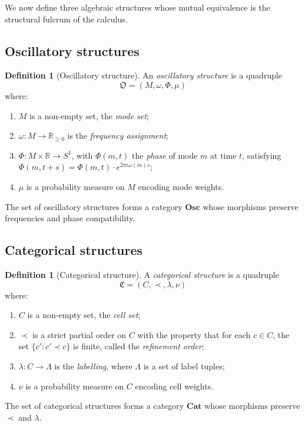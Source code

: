 \documentclass[twocolumn,11pt,a4paper]{article}
\theoremstyle{thmstyle}
\theoremstyle{thmstyle}
\theoremstyle{definition}
\newtheorem{definition}[theorem]{Definition}
\theoremstyle{remark}
\newcommand{\Real}{\mathbb{R}}
\newcommand{\Osc}{\mathfrak{O}}
\newcommand{\Cat}{\mathfrak{C}}
\newcommand{\Cat}{\mathfrak{C}}
\begin{document}
We now define three algebraic structures whose mutual
equivalence is the structural fulcrum of the calculus.

\subsection{Oscillatory structures}

\begin{definition}[Oscillatory structure]\label{def:osc}
An \emph{oscillatory structure} is a quadruple
\[
\Osc = (M, \omega, \Phi, \mu)
\]
where:
\begin{enumerate}[nosep,label=(\roman*)]
\item $M$ is a non-empty set, the \emph{mode set};
\item $\omega : M \to \Real_{\geq 0}$ is the
      \emph{frequency assignment};
\item $\Phi : M \times \Real \to S^{1}$, with
      $\Phi(m, t)$ the \emph{phase} of mode $m$ at time
      $t$, satisfying $\Phi(m, t+s) =
      \Phi(m, t) \cdot e^{2\pi i \omega(m) s}$;
\item $\mu$ is a probability measure on $M$ encoding
      mode weights.
\end{enumerate}
The set of oscillatory structures forms a category
$\mathbf{Osc}$ whose morphisms preserve frequencies
and phase compatibility.
\end{definition}

\subsection{Categorical structures}

\begin{definition}[Categorical structure]\label{def:cat}
A \emph{categorical structure} is a quadruple
\[
\Cat = (C, \prec, \lambda, \nu)
\]
where:
\begin{enumerate}[nosep,label=(\roman*)]
\item $C$ is a non-empty set, the \emph{cell set};
\item $\prec$ is a strict partial order on $C$
      with the property that for each $c \in C$,
      the set $\{c' : c' \prec c\}$ is finite, called
      the \emph{refinement order};
\item $\lambda : C \to \Lambda$ is the
      \emph{labelling}, where $\Lambda$ is a set of
      label tuples;
\item $\nu$ is a probability measure on $C$ encoding
      cell weights.
\end{enumerate}
The set of categorical structures forms a category
$\mathbf{Cat}$ whose morphisms preserve $\prec$ and
$\lambda$.
\end{definition}
\end{document}
